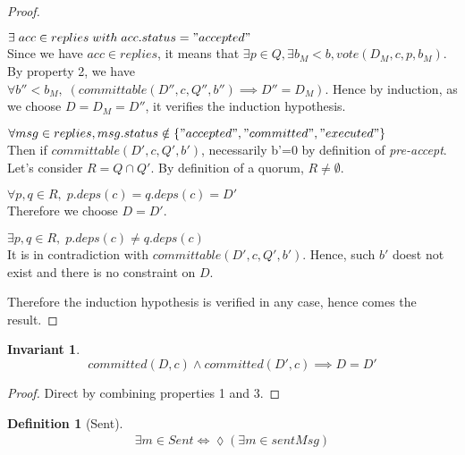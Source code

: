 \documentclass[a4paper]{article}
\theoremstyle{definition}
\newtheorem{definition}{Definition}
\theoremstyle{plain}
\newtheorem{invariant}{Invariant}
\begin{document}
\begin{proof}
\begin{case}
\begin{case}
        \item $\exists \; acc \in replies \; with \; acc.status = "accepted"$ \\
        Since we have $acc \in replies$, it means that $\exists p \in Q,  \exists  b_M < b,  vote(D_M,c,p,b_M).$ \\
        By property 2, we have $\forall b''<b_M, \; (committable(D'',c,Q'',b'') \implies D''=D_M).$ Hence by induction, as we choose $D=D_M=D''$, it verifies the induction hypothesis.
        
        \item $\forall msg \in replies, msg.status \notin \{"accepted", "committed", "executed"\}$ \\
        Then if $committable(D',c,Q',b')$, necessarily b'=0 by definition of \textit{pre-accept}. Let's consider $R = Q \cap Q'$. By definition of a quorum, $R \neq \emptyset$.
        
        \begin{case}
            \item $\forall p,q \in R, \; p.deps(c) = q.deps(c)=D'$ \\
            Therefore we choose $D=D'$.        
            
            \item $\exists p,q \in R, \; p.deps(c) \neq q.deps(c)$ \\
            It is in contradiction with $committable(D',c,Q',b')$. Hence, such $b'$ doest not exist and there is no constraint on $D$. \\
        \end{case}
    \end{case}

\end{case}
Therefore the induction hypothesis is verified in any case, hence comes the result.
\end{proof}


\begin{invariant}
\begin{equation*}
    committed(D,c) \wedge committed(D',c) \implies D=D'
\end{equation*}
\end{invariant}

\begin{proof}
Direct by combining properties 1 and 3.
\end{proof}

\begin{definition}[Sent]
\begin{align*}
     \exists m \in Sent \Longleftrightarrow  \lozenge(\exists m \in sentMsg)
\end{align*}
\end{definition}
\end{document}

